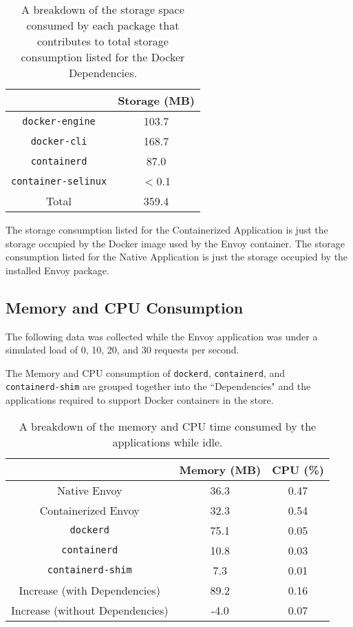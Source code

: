 \documentclass{article}
\begin{document}
\begin{table}[H]
\begin{tabular}{ |c|c| }
 \hline
   & Storage (MB) \\ 
 \hline
 \texttt{docker-engine} & 103.7 \\
 \hline
 \texttt{docker-cli} & 168.7 \\
 \hline
 \texttt{containerd} & 87.0 \\
 \hline
 \texttt{container-selinux} & $<$0.1 \\
 \hline\hline
 Total & 359.4 \\
 \hline
\end{tabular}
\caption{A breakdown of the storage space consumed by each package that contributes to total storage consumption listed for the Docker Dependencies.}
\label{storage-breakdown}
\end{table}

The storage consumption listed for the Containerized Application is just the storage occupied by the Docker image used by the Envoy container. The storage consumption listed for the Native Application is just the storage occupied by the installed Envoy package.

\subsection{Memory and CPU Consumption}
The following data was collected while the Envoy application was under a simulated load of 0, 10, 20, and 30 requests per second.

The Memory and CPU consumption of \texttt{dockerd}, \texttt{containerd}, and\\
\texttt{containerd-shim} are grouped together into the ``Dependencies" and the applications required to support Docker containers in the store.

\begin{table}[H]
\begin{tabular}{ |c|c|c| }
 \hline
   & Memory (MB) & CPU (\%) \\ 
 \hline
 Native Envoy & 36.3 & 0.47 \\
 \hline
 Containerized Envoy & 32.3 & 0.54 \\
 \hline
 \texttt{dockerd} & 75.1 & 0.05 \\
 \hline
 \texttt{containerd} & 10.8 & 0.03 \\
 \hline
 \texttt{containerd-shim} & 7.3 & 0.01 \\
 \hline\hline
 Increase (with Dependencies) & 89.2 & 0.16 \\
 \hline
 Increase (without Dependencies) & -4.0 & 0.07 \\
 \hline
\end{tabular}
\caption{A breakdown of the memory and CPU time consumed by the applications while idle.}
\label{idle-consumption-breakdown}
\end{table}
\end{document}
